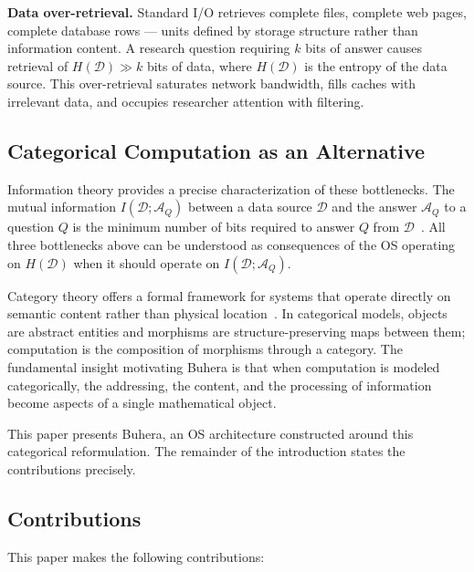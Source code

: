 \documentclass[12pt,twocolumn]{article}
\begin{document}
\textbf{Data over-retrieval.} Standard I/O retrieves complete files, complete web pages, complete database rows --- units defined by storage structure rather than information content. A research question requiring $k$ bits of answer causes retrieval of $H(\mathcal{D}) \gg k$ bits of data, where $H(\mathcal{D})$ is the entropy of the data source. This over-retrieval saturates network bandwidth, fills caches with irrelevant data, and occupies researcher attention with filtering.

\subsection{Categorical Computation as an Alternative}

Information theory provides a precise characterization of these bottlenecks. The mutual information $I(\mathcal{D}; \mathcal{A}_Q)$ between a data source $\mathcal{D}$ and the answer $\mathcal{A}_Q$ to a question $Q$ is the minimum number of bits required to answer $Q$ from $\mathcal{D}$~\cite{cover2006elements}. All three bottlenecks above can be understood as consequences of the OS operating on $H(\mathcal{D})$ when it should operate on $I(\mathcal{D}; \mathcal{A}_Q)$.

Category theory offers a formal framework for systems that operate directly on semantic content rather than physical location~\cite{maclane1998categories,awodey2010category}. In categorical models, objects are abstract entities and morphisms are structure-preserving maps between them; computation is the composition of morphisms through a category. The fundamental insight motivating Buhera is that when computation is modeled categorically, the addressing, the content, and the processing of information become aspects of a single mathematical object.

This paper presents Buhera, an OS architecture constructed around this categorical reformulation. The remainder of the introduction states the contributions precisely.

\subsection{Contributions}

This paper makes the following contributions:
\end{document}

